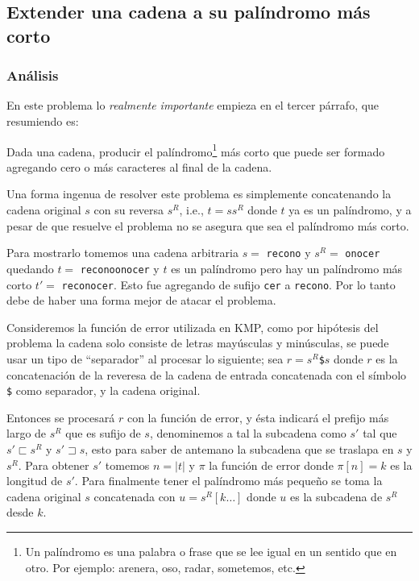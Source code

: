 \newpage


\subsection{Extender una cadena a su palíndromo más corto}

\subsubsection{Análisis}
En este problema lo \textit{realmente importante} empieza en el tercer párrafo, que resumiendo es:

\begin{tcolorbox}
Dada una cadena, producir el palíndromo\footnote{Un palíndromo es una palabra o frase que se lee
igual en un sentido que en otro. Por ejemplo: arenera, oso, radar, sometemos, etc.} más corto que
puede ser formado agregando cero o más caracteres al final de la cadena.
\end{tcolorbox}

Una forma ingenua de resolver este problema es simplemente concatenando la cadena original $s$
con su reversa $s^R$, i.e., $t = ss^R$ donde $t$ ya es un palíndromo, y a pesar de que resuelve el
problema no se asegura que sea el palíndromo más corto.

Para mostrarlo tomemos una cadena arbitraria $s = $ \texttt{recono} y $s^R =$ \texttt{onocer}
quedando $t = $ \texttt{reconoonocer} y $t$ es un palíndromo pero hay un palíndromo más corto
$t' = $ \texttt{reconocer}. Esto fue agregando de sufijo \texttt{cer} a \texttt{recono}. 
Por lo tanto debe de haber una forma mejor de atacar el problema.

Consideremos la función de error utilizada en KMP, como por hipótesis del problema la cadena solo
consiste de letras mayúsculas y minúsculas, se puede usar un tipo de ``separador'' al procesar lo
siguiente; sea $r = s^R$\texttt{\$}$s$ donde $r$ es la concatenación de la reveresa de la cadena de
entrada concatenada con el símbolo \texttt{\$} como separador, y la cadena original.

Entonces se procesará $r$ con la función de error, y ésta indicará el prefijo más largo de $s^R$
que es sufijo de $s$, denominemos a tal la subcadena como $s'$ tal que $s' \sqsubset s^R$ y
$s' \sqsupset s$, esto para saber de antemano la subcadena que se traslapa en $s$ y $s^R$. Para
obtener $s'$ tomemos $n = \vert t \vert$ y $\pi$ la función de error donde $\pi[n] = k$ es la 
longitud de $s'$. Para finalmente tener el palíndromo más pequeño se toma la cadena original $s$
concatenada con $u = s^R[k \ldots]$ donde $u$ es la subcadena de $s^R$ desde $k$.

